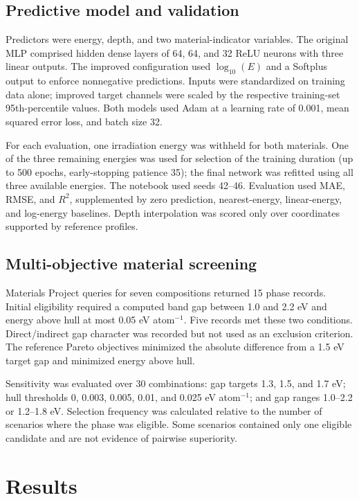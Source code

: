 \documentclass[10pt,letterpaper,twocolumn]{article}
\begin{document}
\subsection{Predictive model and validation}
Predictors were energy, depth, and two material-indicator variables. The original MLP comprised hidden dense layers of 64, 64, and 32 ReLU neurons with three linear outputs. The improved configuration used $\log_{10}(E)$ and a Softplus output to enforce nonnegative predictions. Inputs were standardized on training data alone; improved target channels were scaled by the respective training-set 95th-percentile values. Both models used Adam at a learning rate of 0.001, mean squared error loss, and batch size 32.

For each evaluation, one irradiation energy was withheld for both materials. One of the three remaining energies was used for selection of the training duration (up to 500 epochs, early-stopping patience 35); the final network was refitted using all three available energies. The notebook used seeds 42--46. Evaluation used MAE, RMSE, and $R^2$, supplemented by zero prediction, nearest-energy, linear-energy, and log-energy baselines. Depth interpolation was scored only over coordinates supported by reference profiles.

\subsection{Multi-objective material screening}
Materials Project queries for seven compositions returned 15 phase records. Initial eligibility required a computed band gap between 1.0 and 2.2 eV and energy above hull at most 0.05 eV atom$^{-1}$. Five records met these two conditions. Direct/indirect gap character was recorded but not used as an exclusion criterion. The reference Pareto objectives minimized the absolute difference from a 1.5 eV target gap and minimized energy above hull.

Sensitivity was evaluated over 30 combinations: gap targets 1.3, 1.5, and 1.7 eV; hull thresholds 0, 0.003, 0.005, 0.01, and 0.025 eV atom$^{-1}$; and gap ranges 1.0--2.2 or 1.2--1.8 eV. Selection frequency was calculated relative to the number of scenarios where the phase was eligible. Some scenarios contained only one eligible candidate and are not evidence of pairwise superiority.

\section{Results}
\end{document}
